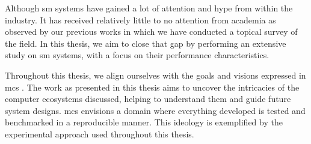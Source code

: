Although \gls{sm} systems have gained a lot of attention and hype from within the industry. It has received relatively little to no attention from academia as observed by our previous works in which we have conducted a topical survey of the field. In this thesis, we aim to close that gap by performing an extensive study on \gls{sm} systems, with a focus on their performance characteristics.

Throughout this thesis, we align ourselves with the goals and visions expressed in \gls{mcs} \cite{Iosup2018}. The work as presented in this thesis aims to uncover the intricacies of the computer ecosystems discussed, helping to understand them and guide future system designs. \gls{mcs} envisions a domain where everything developed is tested and benchmarked in a reproducible manner. This ideology is exemplified by the experimental approach used  throughout this thesis.




